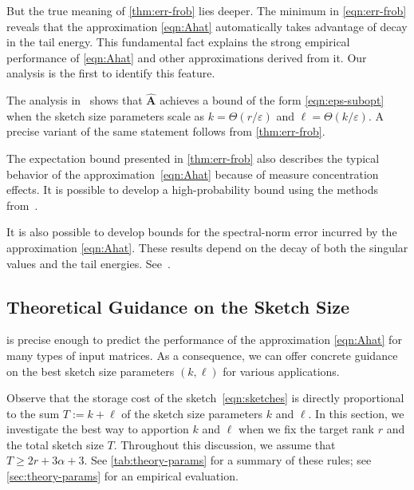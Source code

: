 \documentclass[final]{siamart1116}
\numberwithin{equation}{section}
\numberwithin{theorem}{section}
\numberwithin{figure}{section}
\newcommand{\eps}{\varepsilon}
\newcommand{\mtx}[1]{\bm{#1}}
\begin{document}
But the true meaning of \cref{thm:err-frob} lies deeper.
The minimum in \cref{eqn:err-frob} reveals that the approximation \cref{eqn:Ahat} automatically
takes advantage of decay in the tail energy.  This fundamental fact
explains the strong empirical performance of \cref{eqn:Ahat}
and other approximations derived from it.
Our analysis is the first to identify this feature.

\begin{remark}
The analysis in~\cite[Thm.~3.7]{CW09:Numerical-Linear} shows
that $\hat{\mtx{A}}$ achieves a bound of the form \cref{eqn:eps-subopt}
when the sketch size parameters scale as $k = \Theta(r/\eps)$
and $\ell = \Theta(k/\eps)$.  A precise variant of
the same statement follows from \cref{thm:err-frob}.
\end{remark}

\begin{remark}
The expectation bound presented in \cref{thm:err-frob}
also describes the typical behavior of the approximation~\cref{eqn:Ahat} because
of measure concentration effects.  It is possible to develop a high-probability
bound using the methods from~\cite[Sec.~10.3]{HMT11:Finding-Structure}.
\end{remark}

\begin{remark}
It is also possible to develop bounds for the spectral-norm
error incurred by the approximation \cref{eqn:Ahat}.  These
results depend on the decay of both the singular values and the
tail energies.  See~\cite[Thm.~4.2]{TYUC17:Randomized-Single-View-TR}.
\end{remark}










\subsection{Theoretical Guidance on the Sketch Size}
\label{sec:best-parameters}




 is precise enough to predict the performance
of the approximation \cref{eqn:Ahat} for many types of input matrices.
As a consequence, we can offer concrete guidance on the best sketch size parameters
$(k, \ell)$ for various applications.

Observe that the storage cost of the sketch~\cref{eqn:sketches}
is directly proportional to the sum $T := k + \ell$ of the sketch size parameters $k$ and $\ell$.
In this section, we investigate the best way to apportion $k$ and $\ell$
when we fix the target rank $r$ and the total sketch size $T$.
Throughout this discussion, we assume that $T \geq 2r + 3\alpha + 3$.
See \cref{tab:theory-params} for a summary of these rules;
see \cref{sec:theory-params} for an empirical evaluation.
\end{document}
